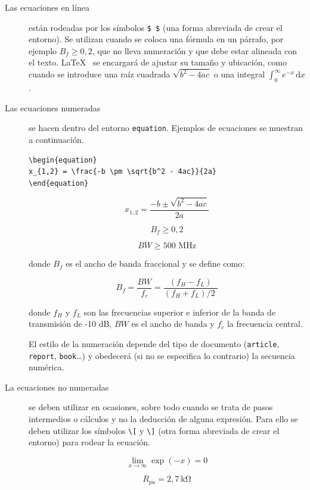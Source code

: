 \documentclass[12pt,letterpaper]{article}
\begin{document}
\begin{description}

\item [Las ecuaciones en línea] están rodeadas por los símbolos \verb+$ $+ (una forma abreviada de crear el entorno). Se utilizan cuando se coloca una fórmula en un párrafo, por ejemplo $ {{B}_{f}}\ge 0,2 $, que no lleva numeración y que debe estar alineada con el texto. \LaTeX~ se encargará de ajustar su tamaño y ubicación, como cuando se introduce una raíz cuadrada $ \sqrt {{b^2} - 4ac} $ o una integral  $ \int_0^\infty e^{-x}\,\mathrm{d}x $. 

\item [Las ecuaciones numeradas] se hacen dentro del entorno \texttt{equation}. Ejemplos de ecuaciones se muestran a continuación.

\begin{verbatim}
\begin{equation}
x_{1,2} = \frac{-b \pm \sqrt{b^2 - 4ac}}{2a}
\end{equation}
\end{verbatim}

\begin{equation}
x_{1,2} = \frac{-b \pm \sqrt{b^2 - 4ac}}{2a}
\end{equation}

\begin{equation}\label{E:desigualdad}
{B}_{f}\ge 0,2
\end{equation}

\begin{equation}\label{E:anchodebanda}
BW\ge 500\text{ MHz}
\end{equation}

donde $ {B}_{f} $ es el ancho de banda fraccional y se define como:

\begin{equation}\label{E:fraccional}
{{B}_{f}}=\frac{BW}{{{f}_{c}}}=\frac{\left( {{f}_{H}}-{{f}_{L}} \right)}{{\left( {{f}_{H}}+{{f}_{L}} \right)}/{2}\;}
\end{equation}

donde $f_H$ y $f_L$ son las frecuencias superior e inferior de la banda de transmisión de -10 dB, $ BW $ es el ancho de banda y $f_c$ la frecuencia central.

El estilo de la numeración depende del tipo de documento (\texttt{article}, \texttt{report}, \texttt{book}\ldots) y obedecerá (si no se especifica lo contrario) la secuencia numérica.

\item [La ecuaciones no numeradas] se deben utilizar en ocasiones, sobre todo cuando se trata de pasos intermedios o cálculos y no la deducción de alguna expresión. Para ello se deben utilizar los símbolos \verb+\[+ y \verb+\]+ (otra forma abreviada de crear el entorno) para rodear la ecuación.

\[
 \lim_{x \to \infty} \exp(-x) = 0
\]

\[
 R_{pu} = 2,7~\si{\kilo\ohm}
\]

\end{description}
\end{document}
